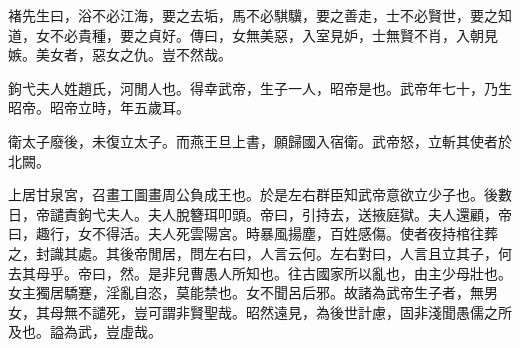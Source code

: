 褚先生曰，浴不必江海，要之去垢，馬不必騏驥，要之善走，士不必賢世，要之知道，女不必貴種，要之貞好。傳曰，女無美惡，入室見妒，士無賢不肖，入朝見嫉。美女者，惡女之仇。豈不然哉。

鉤弋夫人姓趙氏，河閒人也。得幸武帝，生子一人，昭帝是也。武帝年七十，乃生昭帝。昭帝立時，年五歲耳。

衛太子廢後，未復立太子。而燕王旦上書，願歸國入宿衛。武帝怒，立斬其使者於北闕。

上居甘泉宮，召畫工圖畫周公負成王也。於是左右群臣知武帝意欲立少子也。後數日，帝譴責鉤弋夫人。夫人脫簪珥叩頭。帝曰，引持去，送掖庭獄。夫人還顧，帝曰，趣行，女不得活。夫人死雲陽宮。時暴風揚塵，百姓感傷。使者夜持棺往葬之，封識其處。其後帝閒居，問左右曰，人言云何。左右對曰，人言且立其子，何去其母乎。帝曰，然。是非兒曹愚人所知也。往古國家所以亂也，由主少母壯也。女主獨居驕蹇，淫亂自恣，莫能禁也。女不聞呂后邪。故諸為武帝生子者，無男女，其母無不譴死，豈可謂非賢聖哉。昭然遠見，為後世計慮，固非淺聞愚儒之所及也。謚為武，豈虛哉。
